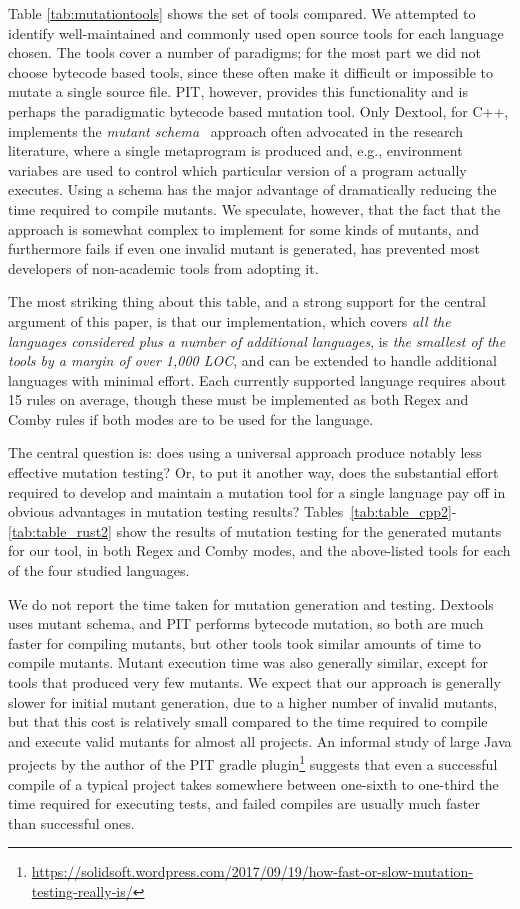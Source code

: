 \documentclass[sigconf,review, anonymous]{acmart}
\begin{document}
{Table \ref{tab:mutationtools} shows the set of tools compared.  We
attempted to identify well-maintained and commonly used open
source tools for each
language chosen.  The tools cover a number of paradigms; for the most
part we did not choose bytecode based tools, since these often make it
difficult or impossible to mutate a single source file.  PIT, however,
provides this functionality and is perhaps the paradigmatic bytecode
based mutation tool.  Only Dextool, for C++, implements the
\emph{mutant schema}~\cite{untch1993mutation} approach often advocated
in the research literature, where a single metaprogram is produced
and, e.g., environment variabes are used to control which particular
version of a program actually executes.  Using a schema has the major
advantage of dramatically reducing the time required to compile
mutants.  We speculate, however, that the fact that the approach is
somewhat complex to implement for some kinds of mutants, and
furthermore fails if even one invalid mutant is generated, has
prevented most developers of non-academic tools from adopting it.

The most striking thing about this table, and a strong support for
the central argument of this paper, is that our implementation, which
covers \emph{all the languages considered plus a number of additional
languages}, is \emph{the smallest of the tools by a margin of over 1,000 LOC},
and can be extended to handle additional languages with minimal
effort.  Each currently supported language requires about 15 rules on
average, though these must be implemented as both Regex and Comby
rules if both modes are to be used for the language.

The central question is: does using a universal approach produce
notably less effective mutation testing?  Or, to put it another way,
does the substantial effort required to develop and maintain a
mutation tool for a single language pay off in obvious advantages in
mutation testing results?
Tables~\ref{tab:table_cpp2}-\ref{tab:table_rust2} show the results of
mutation testing for the generated mutants for our tool, in both Regex
and Comby modes, and the above-listed tools for each of the four
studied languages.

We do not report the time taken for mutation generation and testing.
Dextools uses mutant schema, and PIT performs bytecode mutation, so
both are much faster for compiling mutants, but other tools took similar
amounts of time to compile mutants.   Mutant execution time was also
generally similar, except for tools that produced very few mutants.
We expect that our approach is generally slower for initial mutant
generation, due to a higher number of invalid mutants, but that this
cost is relatively small compared to the time required to compile and
execute valid mutants for almost all projects.  An informal study of
large Java projects by the author of the PIT gradle
plugin\footnote{\url{https://solidsoft.wordpress.com/2017/09/19/how-fast-or-slow-mutation-testing-really-is/}}
  suggests that even a successful compile of a typical project takes
  somewhere between one-sixth to one-third the time required for
  executing tests, and failed compiles are usually much
  faster than successful ones.

}
\end{document}
